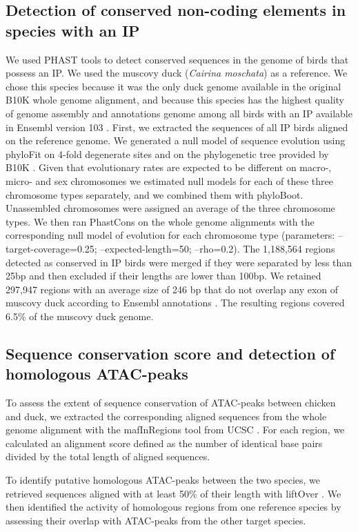 \subsection*{Detection of conserved non-coding elements in species with an IP}
We used PHAST tools \citep{siepel_evolutionarily_2005} to detect conserved sequences in the genome of birds that possess an IP. We used the muscovy duck (\textit{Cairina moschata}) as a reference. We chose this species because it was the only duck genome available in the original B10K whole genome alignment, and because this species has the highest quality of genome assembly and annotations genome among all birds with an IP available in Ensembl version 103 \citep{cunningham_ensembl_2019}.
First, we extracted the sequences of all IP birds aligned on the reference genome. We generated a null model of sequence evolution using phyloFit on 4-fold degenerate sites and on the phylogenetic tree provided by B10K \citep{feng_dense_2020}. Given that evolutionary rates are expected to be different on macro-, micro- and sex chromosomes we estimated null models for each of these three chromosome types separately, and we combined them with phyloBoot. Unassembled chromosomes were assigned an average of the three chromosome types. We then ran PhastCons on the whole genome alignments with the corresponding null model of evolution for each chromosome type (parameters: –target-coverage=0.25; –expected-length=50; –rho=0.2). The 1,188,564 regions detected as conserved in IP birds were merged if they were separated by less than 25bp and then excluded if their lengths are lower than 100bp. We retained 297,947 regions with an average size of 246 bp that do not overlap any exon of muscovy duck according to Ensembl annotations \citep{cunningham_ensembl_2019}. The resulting regions covered 6.5\% of the muscovy duck genome.

\subsection*{Sequence conservation score and detection of homologous ATAC-peaks}
To assess the extent of sequence conservation of ATAC-peaks between chicken and duck, we extracted the corresponding aligned sequences from the whole genome alignment with the mafInRegions tool from UCSC \citep{kent_human_2012}. For each region, we calculated an alignment score defined as the number of identical base pairs divided by the total length of aligned sequences.

To identify putative homologous ATAC-peaks between the two species, we retrieved sequences aligned with at least 50\% of their length with liftOver \citep{kent_human_2012}. We then identified the activity of homologous regions from one reference species by assessing their overlap with ATAC-peaks from the other target species.

